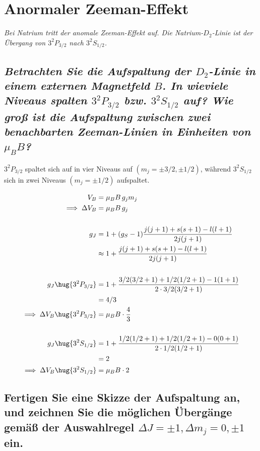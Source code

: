 \documentclass[ex, minted]{exercise_4.0}
\begin{document}
\section{Anormaler Zeeman-Effekt}
{\it Bei Natrium tritt der anomale Zeeman-Effekt auf. Die Natrium-$D_2$-Linie ist der Übergang von $3^2P_{3/2}$ nach
$3^2S_{1/2}$.}

\subsection{\it Betrachten Sie die Aufspaltung der $D_2$-Linie in einem externen Magnetfeld $B$. In wieviele Niveaus spalten $3^2P_{3/2}$ bzw. $3^2S_{1/2}$ auf?
Wie groß ist die Aufspaltung zwischen zwei benachbarten Zeeman-Linien in Einheiten von $\mu_B B$?}

\dottedlinett

$3^2P_{3/2}$ spaltet sich auf in vier Niveaus auf \((m_j = \pm3/2, \pm1/2 )\), während 
$3^2S_{1/2}$ sich in zwei Niveaus \((m_j = \pm1/2)\) aufspaltet.

\begin{align*}
    V_B &= \mu_B B \, g_j m_j \\
    \implies \Delta V_B &= \mu_B B \, g_j \\
    \\
    g_J &= 1 +(g_S-1)\frac{j(j+1) + s(s+1) - l(l+1)}{2 j(j+1)} \\
    &\approx  1 +\frac{j(j+1) + s(s+1) - l(l+1)}{2 j(j+1)} \\
    \\
    g_J\hug{3^2P_{3/2}} &= 1 + \frac{3/2(3/2+1) + 1/2(1/2+1) - 1(1+1)}{2 \cdot 3/2(3/2+1)}\\
    &= 4/3\\
    \implies \Delta V_B\hug{3^2P_{3/2}} &= \mu_B B \cdot \frac43\\
    \\
    g_J\hug{3^2S_{1/2}} &= 1 + \frac{1/2(1/2+1) + 1/2(1/2+1) - 0(0+1)}{2 \cdot 1/2(1/2+1)}\\
    &= 2\\
    \implies \Delta V_B\hug{3^2S_{1/2}} &= \mu_B B \cdot 2
\end{align*}

\subsection{Fertigen Sie eine Skizze der Aufspaltung an, und zeichnen Sie die möglichen Übergänge gemäß der Auswahlregel $\Delta J = \pm1, \Delta m_j = 0, \pm1$ ein.}
\end{document}
